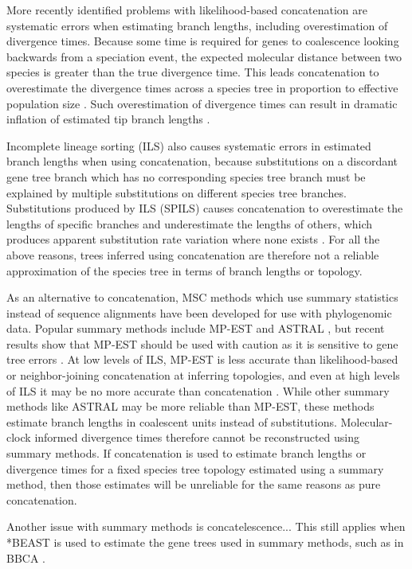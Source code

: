 \documentclass[12pt]{article}
\begin{document}
More recently identified problems with likelihood-based concatenation are systematic errors when
estimating branch lengths, including overestimation of divergence times. Because
some time is required for genes to coalescence looking backwards from
a speciation event, the expected molecular distance between two species is
greater than the true divergence time. This leads concatenation to overestimate
the divergence times across a species tree in proportion to effective population size
\citep{doi:10.1146/annurev.ecolsys.33.010802.150500}. Such overestimation of divergence times can result in dramatic
inflation of estimated tip branch lengths \citep{Ogilvie01052016}.

Incomplete lineage sorting (ILS) also causes systematic errors in estimated
branch lengths when using concatenation, because substitutions on a discordant gene tree branch
which has no corresponding species tree branch must be explained by multiple
substitutions on different species tree branches. Substitutions
produced by ILS (SPILS) causes concatenation to overestimate the lengths of specific
branches and underestimate the lengths of others, which produces apparent
substitution rate variation where none exists \citep{Mendes01072016}. For all
the above reasons, trees
inferred using concatenation are therefore not a reliable approximation of the
species tree in terms of branch lengths or topology.

As an alternative to concatenation, MSC methods which use summary statistics instead
of sequence alignments have been developed for use with phylogenomic data.
Popular summary methods include MP-EST and ASTRAL \citep{Liu2010,
Mirarab01092014}, but recent results show that MP-EST should be used with caution as it is
sensitive to gene tree errors \citep{Mirarab15062015, Xi201563}. At low levels of
ILS, MP-EST is less accurate than likelihood-based or neighbor-joining concatenation at
inferring topologies, and even at high levels of ILS it may be no more accurate
than concatenation \citep{Ogilvie01052016}. While other summary methods like
ASTRAL may be more reliable than MP-EST, these methods estimate branch lengths
in coalescent units instead of substitutions. Molecular-clock informed divergence times therefore cannot be
reconstructed using summary methods. If concatenation is used to estimate branch
lengths or divergence times for a fixed species tree
topology estimated using a summary method, then those estimates will be
unreliable for the same reasons as pure concatenation.

Another issue with summary methods is concatelescence... This still applies when *BEAST is used to
estimate the gene trees used in summary methods, such as in BBCA \citep{BBCA}. 
\end{document}
